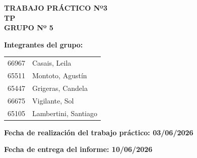 \begin{center}
    
    {\large \textbf{TRABAJO PRÁCTICO Nº3}}\\[0.5cm]
    
    {\Large \textbf{TP }}\\[1cm]
    
    {\normalsize \textbf{GRUPO Nº 5}}\\[0.5cm]

\end{center}

\vspace{0.5cm}

\textbf{Integrantes del grupo:}

\vspace{0.3cm}

\begin{tabular}{p{5cm} p{8cm}}
66967 & Casais, Leila \\
65511 & Montoto, Agustín \\
65447 & Grigeras, Candela\\
66675 & Vigilante, Sol \\
65105 & Lambertini, Santiago \\
\end{tabular}

\vspace{0.8cm}

\textbf{Fecha de realización del trabajo práctico: 03/06/2026} \\
\vspace{0.3cm}

\textbf{Fecha de entrega del informe: 10/06/2026}

\vspace{1cm}

\newpage